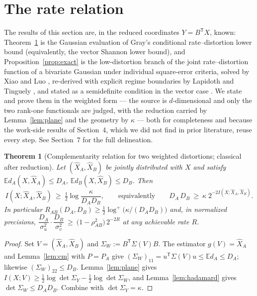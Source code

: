 \documentclass[11pt]{article}
\newtheorem{theorem}{Theorem}\newtheorem{lemma}{Lemma}
\newcommand{\E}{\mathbb{E}}\newcommand{\tr}{\operatorname{tr}}
\newcommand{\hX}{\widehat X}\newcommand{\hY}{\widehat Y}
\begin{document}
\section{The rate relation}
The results of this section are, in the reduced coordinates $Y=B^{\mathsf
T}X$, known: Theorem~\ref{thm:rate} is the Gaussian evaluation of Gray's
conditional rate--distortion lower bound \cite{gray1973} (equivalently, the
vector Shannon lower bound), and Proposition~\ref{prop:exact} is the
low-distortion branch of the joint rate--distortion function of a bivariate
Gaussian under individual square-error criteria, solved by Xiao and Luo
\cite[Thm.~6]{xiaoluo2005}, re-derived with explicit regime boundaries by
Lapidoth and Tinguely \cite[Thm.~III.1]{lapidothtinguely2010}, and stated as
a semidefinite condition in the vector case
\cite{stylianou2021,chen2026}. We state and prove them in the
weighted form --- the source is $d$-dimensional and only the two
rank-one functionals are judged, with the reduction carried by
Lemma~\ref{lem:plane} and the geometry by $\kappa$ --- both for completeness
and because the work-side results of Section~4, which we did not find in
prior literature, reuse every step. See Section~7 for the full delineation.

\begin{theorem}[Complementarity relation for two weighted distortions;
classical after reduction]\label{thm:rate}
Let $(\hX_A,\hX_B)$ be jointly distributed with $X$ and satisfy
$\E d_A(X,\hX_A)\le D_A$, $\E d_B(X,\hX_B)\le D_B$. Then
\begin{equation}
I(X;\hX_A,\hX_B)\ \ge\ \tfrac12\log\frac{\kappa}{D_AD_B},
\qquad\text{equivalently}\qquad
D_A\,D_B\ \ge\ \kappa\;2^{-2I(X;\hX_A,\hX_B)} .
\label{eq:ratebound}
\end{equation}
In particular $R_{AB}(D_A,D_B)\ge\tfrac12\log^+\!\bigl(\kappa/(D_AD_B)\bigr)$
and, in normalized precisions,
$\dfrac{D_A}{\sigma_u^2}\cdot\dfrac{D_B}{\sigma_v^2}\ \ge\
\bigl(1-\rho_{AB}^2\bigr)\,2^{-2R}$ at any achievable rate $R$.
\end{theorem}
\begin{proof}
Set $V=(\hX_A,\hX_B)$ and $\Sigma_W:=B^{\mathsf T}\Sigma(V)B$. The estimator
$g(V)=\hX_A$ and Lemma~\ref{lem:cm} with $P=P_A$ give
$(\Sigma_W)_{11}=u^{\mathsf T}\Sigma(V)u\le\E d_A\le D_A$; likewise
$(\Sigma_W)_{22}\le D_B$. Lemma~\ref{lem:plane} gives
$I(X;V)\ge\tfrac12\log\det\Sigma_Y-\tfrac12\log\det\Sigma_W$, and
Lemma~\ref{lem:hadamard} gives $\det\Sigma_W\le D_AD_B$. Combine with
$\det\Sigma_Y=\kappa$.
\end{proof}
\end{document}
